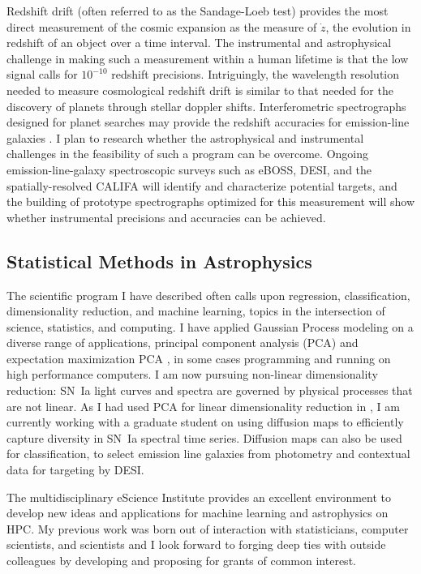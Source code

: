 \documentclass{article}
\begin{document}
Redshift drift (often referred to as the Sandage-Loeb test) provides the most direct  measurement
of the cosmic expansion as the measure of $\dot{z}$, the evolution in redshift of an object over a time interval.
The instrumental
and astrophysical challenge
in making such a measurement within a human lifetime
is that the low signal calls for $10^{-10}$ redshift precisions.  Intriguingly, the wavelength resolution needed to measure
cosmological redshift drift is similar to that needed for the discovery of planets through stellar doppler shifts.
Interferometric spectrographs designed for planet searches may provide the redshift accuracies for emission-line galaxies
\cite{drift}.
I plan to research whether the astrophysical and instrumental challenges in the feasibility of such a program can be overcome.
Ongoing  emission-line-galaxy  spectroscopic surveys such
as eBOSS, DESI, and the spatially-resolved CALIFA will identify and characterize
potential targets, and the building of prototype spectrographs optimized for this measurement will show whether
instrumental precisions and accuracies can be achieved.

\subsection{Statistical Methods in Astrophysics}
The scientific program I have described often calls upon regression, classification, dimensionality reduction,
and machine learning, topics in the intersection of science, statistics, and computing.  I have applied Gaussian Process modeling
on a diverse range of applications, principal component
analysis (PCA) and expectation maximization PCA \cite{2012PhRvD..85l3530S,2013ApJ...766...84K,
2013PhRvD..87l3512H}, in some cases programming and running on high performance computers.
I am now pursuing non-linear dimensionality reduction: SN~Ia light curves and spectra
are governed by physical processes that are not linear.  As I had used PCA for linear
dimensionality reduction in  \cite{2013ApJ...766...84K}, I am currently working with a graduate student on
using diffusion maps to efficiently capture diversity in SN~Ia spectral time series.  Diffusion maps can also
be used for classification, to select emission line galaxies from photometry and contextual data for targeting by DESI.

The multidisciplinary eScience Institute provides an excellent environment to develop new ideas and applications
for machine learning and astrophysics on HPC.
My previous work was born out of interaction with statisticians, computer scientists,
and scientists and I look forward to forging deep ties with outside colleagues by developing and proposing
for grants of common interest.
\end{document}
